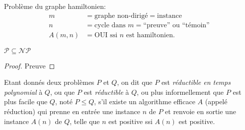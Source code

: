 \begin{myexem}
  Problème du graphe hamiltonien:
  \begin{align*}
    m & = \text{graphe non-dirigé} = \text{instance}\\
    n & = \text{cycle dans }m = \text{``preuve'' ou ``témoin''}\\
    A(m,n) & = \text{OUI ssi }n\text{ est hamiltonien}.
  \end{align*}
\end{myexem}

\begin{mycorr}
  $\mathcal{P} \subseteq \mathcal{NP}$
  \begin{proof}
     Preuve \addTODO
  \end{proof}
\end{mycorr}

\begin{mydef}
  Etant donnés deux problèmes $P$ et $Q$, on dit que $P$ est \emph{réductible en temps polynomial} à $Q$, ou que $P$ est \emph{réductible} à $Q$, ou plus informellement que $P$ est plus facile que $Q$, noté $P \leq Q$, s’il existe un algorithme efficace $A$ (appelé réduction) qui prenne en entrée une instance $n$ de $P$ et renvoie en sortie une instance $A(n)$ de $Q$, telle que $n$ est positive ssi $A(n)$ est positive.
\end{mydef}

